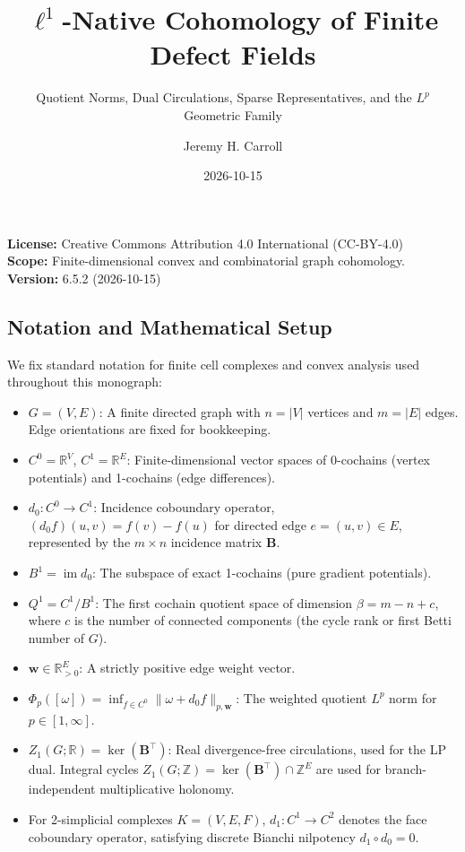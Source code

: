 \documentclass[
]{article}
\title{\(\ell^1\)-Native Cohomology of Finite Defect Fields}
\subtitle{Quotient Norms, Dual Circulations, Sparse Representatives, and the \(L^p\) Geometric Family}
\author{Jeremy H. Carroll}
\date{2026-10-15}
\providecommand{\tightlist}{%
  \setlength{\itemsep}{0pt}\setlength{\parskip}{0pt}}
\providecommand{\tightlist}{%
  \setlength{\itemsep}{0pt}\setlength{\parskip}{0pt}}
\begin{document}
\maketitle

\begingroup
\raggedright
\noindent\textbf{License:} Creative Commons Attribution 4.0 International (CC-BY-4.0)\\[0.4em]
\noindent\textbf{Scope:} Finite-dimensional convex and combinatorial graph cohomology.\\[0.4em]
\noindent\textbf{Version:} 6.5.2 (2026-10-15)
\endgroup

\subsection*{Notation and Mathematical Setup}\label{notation-and-mathematical-setup}

We fix standard notation for finite cell complexes and convex analysis used throughout this monograph:

\begin{itemize}
\tightlist
\item
  \(G = (V,E)\): A finite directed graph with \(n = |V|\) vertices and \(m = |E|\) edges. Edge orientations are fixed for bookkeeping.
\item
  \(C^0 = \mathbb{R}^V\), \(C^1 = \mathbb{R}^E\): Finite-dimensional vector spaces of 0-cochains (vertex potentials) and 1-cochains (edge differences).
\item
  \(d_0: C^0 \to C^1\): Incidence coboundary operator, \((d_0 f)(u,v) = f(v) - f(u)\) for directed edge \(e = (u,v) \in E\), represented by the \(m \times n\) incidence matrix \(\mathbf{B}\).
\item
  \(B^1 = \operatorname{im} d_0\): The subspace of exact 1-cochains (pure gradient potentials).
\item
  \(Q^1 = C^1 / B^1\): The first cochain quotient space of dimension \(\beta = m - n + c\), where \(c\) is the number of connected components (the cycle rank or first Betti number of \(G\)).
\item
  \(\mathbf{w} \in \mathbb{R}_{>0}^E\): A strictly positive edge weight vector.
\item
  \(\Phi_p([\omega]) = \inf_{f \in C^0} \|\omega + d_0 f\|_{p,\mathbf{w}}\): The weighted quotient \(L^p\) norm for \(p \in [1, \infty]\).
\item
  \(Z_1(G;\mathbb{R}) = \ker(\mathbf{B}^\top)\): Real divergence-free circulations, used for the LP dual. Integral cycles \(Z_1(G;\mathbb{Z}) = \ker(\mathbf{B}^\top)\cap\mathbb{Z}^E\) are used for branch-independent multiplicative holonomy.
\item
  For 2-simplicial complexes \(K = (V,E,F)\), \(d_1: C^1 \to C^2\) denotes the face coboundary operator, satisfying discrete Bianchi nilpotency \(d_1 \circ d_0 = 0\).
\end{itemize}
\end{document}
